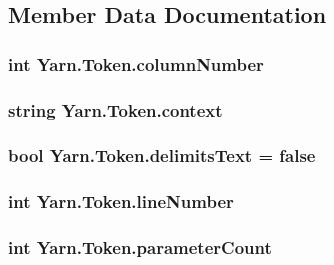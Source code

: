 \subsection{Member Data Documentation}
\hypertarget{a00093_a9a0f0a8a7ab1e90ab48f15192323ffca}{
\subsubsection[{column\-Number}]{\setlength{\rightskip}{0pt plus 5cm}int Yarn.\-Token.\-column\-Number}}\label{a00093_a9a0f0a8a7ab1e90ab48f15192323ffca}
\hypertarget{a00093_a089d248c904a6e8366b81c2c47ff5af8}{
\subsubsection[{context}]{\setlength{\rightskip}{0pt plus 5cm}string Yarn.\-Token.\-context}}\label{a00093_a089d248c904a6e8366b81c2c47ff5af8}
\hypertarget{a00093_af15d26fa4e6f276ab58ff66d3c4203da}{
\subsubsection[{delimits\-Text}]{\setlength{\rightskip}{0pt plus 5cm}bool Yarn.\-Token.\-delimits\-Text = false}}\label{a00093_af15d26fa4e6f276ab58ff66d3c4203da}
\hypertarget{a00093_a80fe710713201bb793a41452e314a721}{
\subsubsection[{line\-Number}]{\setlength{\rightskip}{0pt plus 5cm}int Yarn.\-Token.\-line\-Number}}\label{a00093_a80fe710713201bb793a41452e314a721}
\hypertarget{a00093_adf11c0d29b66935a8d8109d6308d0488}{
\subsubsection[{parameter\-Count}]{\setlength{\rightskip}{0pt plus 5cm}int Yarn.\-Token.\-parameter\-Count}}\label{a00093_adf11c0d29b66935a8d8109d6308d0488}
